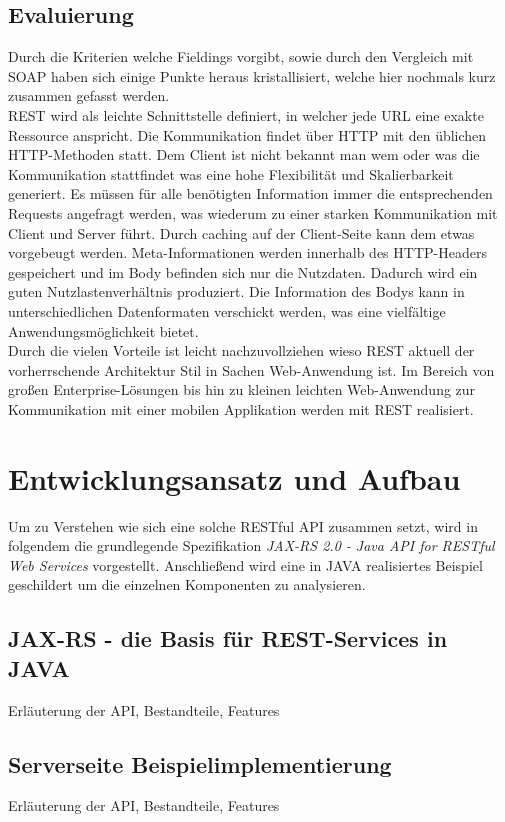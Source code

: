 \documentclass[fleqn,10pt,ngerman]{SelfArx}
\begin{document}
\subsection{Evaluierung}
Durch die Kriterien welche Fieldings vorgibt, sowie durch den Vergleich mit SOAP haben sich einige Punkte heraus kristallisiert, welche hier nochmals kurz zusammen gefasst werden. \\ REST wird als leichte Schnittstelle definiert, in welcher jede URL eine exakte Ressource anspricht. Die Kommunikation findet über HTTP mit den üblichen HTTP-Methoden statt. Dem Client ist nicht bekannt man wem oder was die Kommunikation stattfindet was eine hohe Flexibilität und Skalierbarkeit generiert. Es müssen für alle benötigten Information immer die entsprechenden Requests angefragt werden, was wiederum zu einer starken Kommunikation mit Client und Server führt. Durch caching auf der Client-Seite kann dem etwas vorgebeugt werden. Meta-Informationen werden innerhalb des HTTP-Headers gespeichert und im Body befinden sich nur die Nutzdaten. Dadurch wird ein guten Nutzlastenverhältnis produziert. Die Information des Bodys kann in unterschiedlichen Datenformaten verschickt werden, was eine vielfältige Anwendungsmöglichkeit bietet. \\ Durch die vielen Vorteile ist leicht nachzuvollziehen wieso REST aktuell der vorherrschende Architektur Stil in Sachen Web-Anwendung ist. Im Bereich von großen Enterprise-Lösungen bis hin zu kleinen leichten Web-Anwendung zur Kommunikation mit einer mobilen Applikation werden mit REST realisiert. 

\section{Entwicklungsansatz und Aufbau}
Um zu Verstehen wie sich eine solche RESTful API zusammen setzt, wird in folgendem die grundlegende Spezifikation \textit{JAX-RS 2.0 - Java API for RESTful Web Services} vorgestellt. Anschließend wird eine in JAVA realisiertes Beispiel geschildert um die einzelnen Komponenten zu analysieren. 

\subsection{JAX-RS - die Basis für REST-Services in JAVA}
Erläuterung der API, Bestandteile, Features 

\subsection{Serverseite Beispielimplementierung}
Erläuterung der API, Bestandteile, Features 
\end{document}
